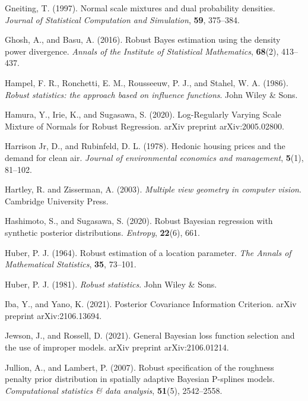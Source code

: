 \documentclass[11pt]{article}
\theoremstyle{plain}
\theoremstyle{definition}
\begin{document}
\begin{thebibliography}{99}
 Gneiting, T. (1997). Normal scale mixtures and dual probability densities. {\it Journal of Statistical Computation and Simulation}, {\bf 59}, 375--384.

 Ghosh, A., and Basu, A. (2016). Robust Bayes estimation using the density power divergence. {\it Annals of the Institute of Statistical Mathematics}, {\bf 68}(2), 413--437.

 Hampel, F. R., Ronchetti, E. M., Rousseeuw, P. J., and Stahel, W. A. (1986). {\it Robust statistics: the approach based on influence functions}. John Wiley \& Sons.

 Hamura, Y., Irie, K., and Sugasawa, S. (2020). Log-Regularly Varying Scale Mixture of Normals for Robust Regression. arXiv preprint arXiv:2005.02800.

 Harrison Jr, D., and Rubinfeld, D. L. (1978). Hedonic housing prices and the demand for clean air. {\it Journal of environmental economics and management}, {\bf 5}(1), 81--102.

 Hartley, R. and Zisserman, A. (2003). {\it Multiple view geometry in computer vision}.
Cambridge University Press.

 Hashimoto, S., and Sugasawa, S. (2020). Robust Bayesian regression with synthetic posterior distributions. {\it Entropy}, {\bf 22}(6), 661.

 Huber, P. J. (1964). Robust estimation of a location parameter. 
{\it The Annals of Mathematical Statistics}, {\bf 35}, 73--101.

 Huber, P. J. (1981). {\it Robust statistics}. John Wiley \& Sons.

 Iba, Y., and Yano, K. (2021). Posterior Covariance Information Criterion. arXiv preprint arXiv:2106.13694.

 Jewson, J., and Rossell, D. (2021). General Bayesian loss function selection and the use of improper models. arXiv preprint arXiv:2106.01214.

 Jullion, A., and Lambert, P. (2007). Robust specification of the roughness penalty prior distribution in spatially adaptive Bayesian P-splines models. {\it Computational statistics \& data analysis}, {\bf 51}(5), 2542--2558.


\end{thebibliography}
\end{document}
